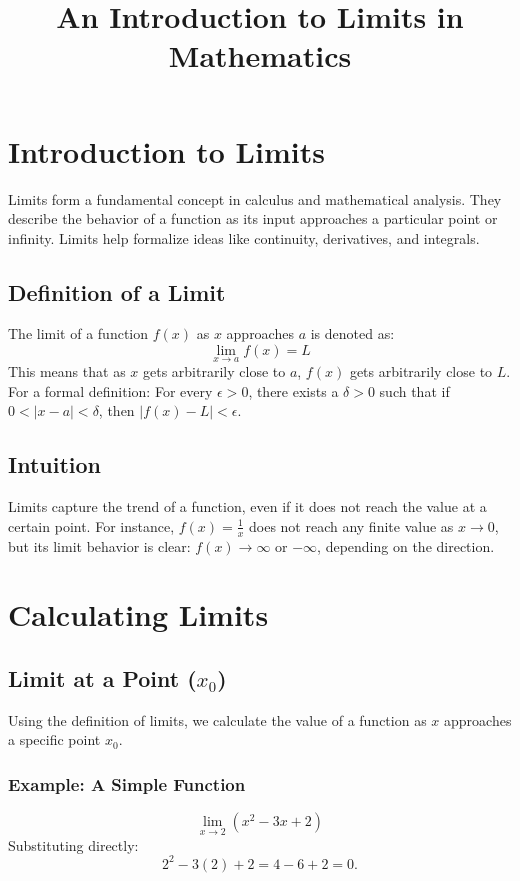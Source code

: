 \documentclass[12pt,a4paper]{article}
\title{An Introduction to Limits in Mathematics}
\author{}
\date{}
\begin{document}
\maketitle

\section{Introduction to Limits}
Limits form a fundamental concept in calculus and mathematical analysis. They describe the behavior of a function as its input approaches a particular point or infinity. Limits help formalize ideas like continuity, derivatives, and integrals.

\subsection{Definition of a Limit}
The limit of a function $f(x)$ as $x$ approaches $a$ is denoted as:
\[
\lim_{x \to a} f(x) = L
\]
This means that as $x$ gets arbitrarily close to $a$, $f(x)$ gets arbitrarily close to $L$. For a formal definition:
For every $\epsilon > 0$, there exists a $\delta > 0$ such that if $0 < |x - a| < \delta$, then $|f(x) - L| < \epsilon$.

\subsection{Intuition}
Limits capture the trend of a function, even if it does not reach the value at a certain point. For instance, $f(x) = \frac{1}{x}$ does not reach any finite value as $x \to 0$, but its limit behavior is clear: $f(x) \to \infty$ or $-\infty$, depending on the direction.

\section{Calculating Limits}

\subsection{Limit at a Point ($x_0$)}
Using the definition of limits, we calculate the value of a function as $x$ approaches a specific point $x_0$.

\subsubsection{Example: A Simple Function}
\[
\lim_{x \to 2} (x^2 - 3x + 2)
\]
Substituting directly:
\[
2^2 - 3(2) + 2 = 4 - 6 + 2 = 0.
\]
\end{document}
